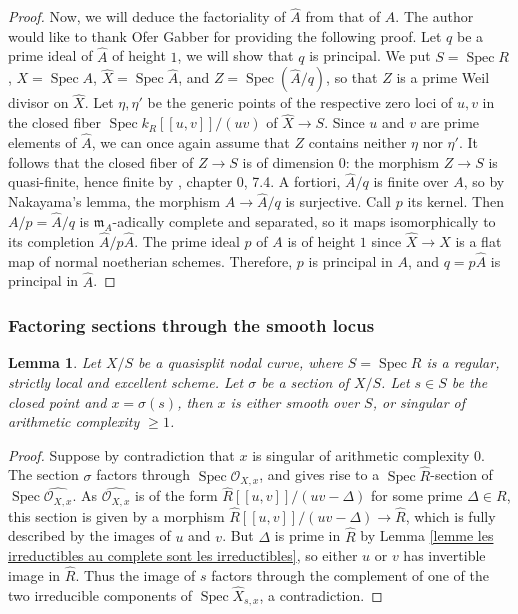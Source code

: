 \documentclass[a4paper,12pt]{amsart} %
\numberwithin{equation}{subsection}
\newcommand{\Spec}{\operatorname{Spec}}
\theoremstyle{definition}
\theoremstyle{plain}%
\newtheorem{lemma}[definition]{Lemma}
\theoremstyle{remark}
\renewcommand{\O}{\mathcal{O}}
\begin{document}
\begin{proof}
	Now, we will deduce the factoriality of $\widehat{A}$ from that of $A$. The author would like to thank Ofer Gabber for providing the following proof. Let $q$ be a prime ideal of $\widehat{A}$ of height $1$, we will show that $q$ is principal. We put $S=\Spec R$, $X=\Spec A$, $\widehat{X}=\Spec \widehat{A}$, and $Z=\Spec (\widehat{A}/q)$, so that $Z$ is a prime Weil divisor on $\widehat{X}$. Let $\eta,\eta'$ be the generic points of the respective zero loci of $u,v$ in the closed fiber $\Spec k_R[[u,v]]/(uv)$ of $\widehat{X}\to S$. Since $u$ and $v$ are prime elements of $\widehat{A}$, we can once again assume that $Z$ contains neither $\eta$ nor $\eta'$. It follows that the closed fiber of $Z \to S$ is of dimension $0$: the morphism $Z\to S$ is quasi-finite, hence finite by \cite{EGA1}, chapter 0, 7.4. A fortiori, $\widehat{A}/q$ is finite over $A$, so by Nakayama's lemma, the morphism $A \to \widehat{A}/q$ is surjective. Call $p$ its kernel. Then $A/p=\widehat{A}/q$ is $\mathfrak{m}_A$-adically complete and separated, so it maps isomorphically to its completion $\widehat{A}/p\widehat{A}$. The prime ideal $p$ of $A$ is of height $1$ since $\widehat{X}\to X$ is a flat map of normal noetherian schemes. Therefore, $p$ is principal in $A$, and $q=p\widehat{A}$ is principal in $\widehat{A}$.
\end{proof}

\subsubsection{Factoring sections through the smooth locus}


\begin{lemma}\label{lemme pas de sections a travers les points de complexite 0}
	Let $X/S$ be a quasisplit nodal curve, where $S=\Spec R$ is a regular, strictly local and excellent scheme. Let $\sigma$ be a section of $X/S$. Let $s\in S$ be the closed point and $x=\sigma(s)$, then $x$ is either smooth over $S$, or singular of arithmetic complexity $\geq 1$.
\end{lemma}

\begin{proof}
	Suppose by contradiction that $x$ is singular of arithmetic complexity $0$. The section $\sigma$ factors through $\Spec \O_{X,x}$, and gives rise to a $\Spec \widehat{R}$-section of $\Spec\widehat{\O_{X,x}}$. As $\widehat{\O_{X,x}}$ is of the form $\widehat{R}[[u,v]]/(uv-\Delta)$ for some prime $\Delta\in R$, this section is given by a morphism $\widehat{R}[[u,v]]/(uv-\Delta)\to\widehat{R}$, which is fully described by the images of $u$ and $v$. But $\Delta$ is prime in $\widehat{R}$ by Lemma \ref{lemme les irreductibles au complete sont les irreductibles}, so either $u$ or $v$ has invertible image in $\widehat{R}$. Thus the image of $s$ factors through the complement of one of the two irreducible components of $\Spec\widehat X_{s,x}$, a contradiction.
\end{proof}
\end{document}

